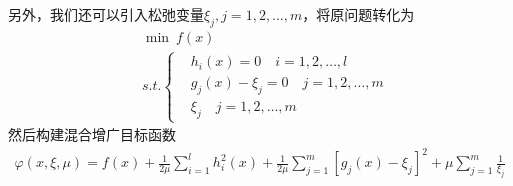         另外，我们还可以引入松弛变量${\xi}_j,j=1,2,\ldots,m$，将原问题转化为
        \begin{align*}
        &\mathop {\min}\  f(x)\\
        &s.t.\left\{
        \begin{aligned}
        &h_i(x)=0\quad i=1,2,\ldots,l\\
        &g_j(x)-{\xi}_j = 0\quad j=1,2,\ldots,m\\
        &{\xi}_j\quad j=1,2,\ldots,m
        \end{aligned}
        \right.
        \end{align*}
        然后构建混合增广目标函数
        \begin{align*}
        \varphi(x,\xi,\mu)=f(x)+\frac{1}{2\mu}\mathop {\sum}\limits_{i=1}^l h_i^2(x)+\frac{1}{2\mu}\mathop {\sum}\limits_{j=1}^m [{g_j(x)}-{\xi}_j]^2+\mu\mathop {\sum}\limits_{j=1}^m \frac {1}{{\xi}_j}
        \end{align*}
